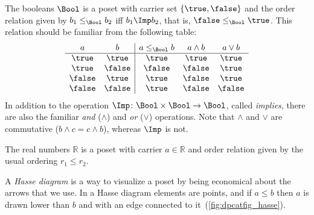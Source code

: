 \begin{example}[Booleans]\label{ex:bool}
The booleans $\Bool$ is a poset with carrier set $\{\true,\false\}$ and the order relation given by $b_1 \leq_\Bool b_2$ iff $b_1 \Imp b_2$, that is, $\false \leq_\Bool \true$. This relation should be familiar from the following table:
\[
\begin{array}{cc|ccc}
a & b & a \leq_\Bool b & a \wedge b & a \vee b \\ \hline
\true&\true&\true&\true&\true\\
\true&\false&\false&\false&\true\\
\false&\true&\true&\false&\true\\
\false&\false&\true&\false&\false
\end{array}
\]
In addition to the operation $\Imp\colon\Bool\times \Bool\to\Bool$, called \emph{implies}, there are also the familiar \emph{and} ($\wedge$) and \emph{or} ($\vee$) operations. Note that $\wedge$ and $\vee$ are commutative ($b\wedge c = c\wedge b$), whereas $\Imp$ is not.
\end{example}



\begin{example}[Reals]
The real numbers $\mathbb{R}$ is a poset with carrier $a\in \mathbb{R}$ and order relation given by the usual ordering $r_1 \leq r_2$.
\end{example}


A \emph{Hasse diagram} is a way to visualize a poset by being economical about the arrows that we use. In a Hasse diagram elements are points, and if $a \leq b$ then $a$ is drawn lower than $b$ and with an edge connected to it~(\cref{fig:dpcatfig_hasse}).



\begin{example}
\label{ex:hasseinclusion}


\begin{center}
\end{center}
\end{example}

